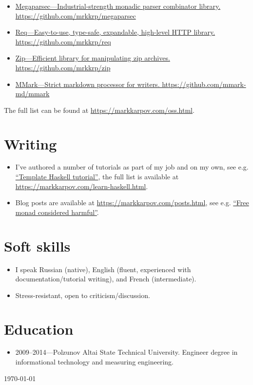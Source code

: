 \documentclass[a4paper,12pt]{article}
\begin{document}
\begin{itemize}[noitemsep]
\item \href{https://github.com/mrkkrp/megaparsec}
  {Megaparsec---Industrial-strength monadic parser combinator library.
    \newline
    https://github.com/mrkkrp/megaparsec}
\item \href{https://github.com/mrkkrp/req}
  {Req---Easy-to-use, type-safe, expandable, high-level HTTP library.
    \newline
    https://github.com/mrkkrp/req}
\item \href{https://github.com/mrkkrp/zip}
  {Zip---Efficient library for manipulating zip archives.
    \newline
    https://github.com/mrkkrp/zip}
\item \href{https://github.com/mmark-md/mmark}
  {MMark---Strict markdown processor for writers.
    \newline
    https://github.com/mmark-md/mmark}
\end{itemize}

The full list can be found at \href{https://markkarpov.com/oss.html}{https://markkarpov.com/oss.html}.

\section*{Writing}

\begin{itemize}[noitemsep]
\item I've authored a number of tutorials as part of my job and on my own,
  see e.g. \href{https://markkarpov.com/tutorial/th.html}{“Template Haskell
    tutorial”}, the full list is available at \\
  \href{https://markkarpov.com/learn-haskell.html}{https://markkarpov.com/learn-haskell.html}.
\item Blog posts are available at
  \href{https://markkarpov.com/posts.html}{https://markkarpov.com/posts.html},
  see e.g.
  \href{https://markkarpov.com/post/free-monad-considered-harmful.html}{“Free
    monad considered harmful”}.
\end{itemize}

\section*{Soft skills}

\begin{itemize}[noitemsep]
\item I speak Russian (native), English (fluent, experienced with
  documentation/tutorial writing), and French (intermediate).
\item Stress-resistant, open to criticism/discussion.
\end{itemize}

\section*{Education}

\begin{itemize}[noitemsep]
\item 2009--2014---Polzunov Altai State Technical University. Engineer
  degree in informational technology and measuring engineering.
\end{itemize}

\begin{flushright}
  \today
\end{flushright}
\end{document}

